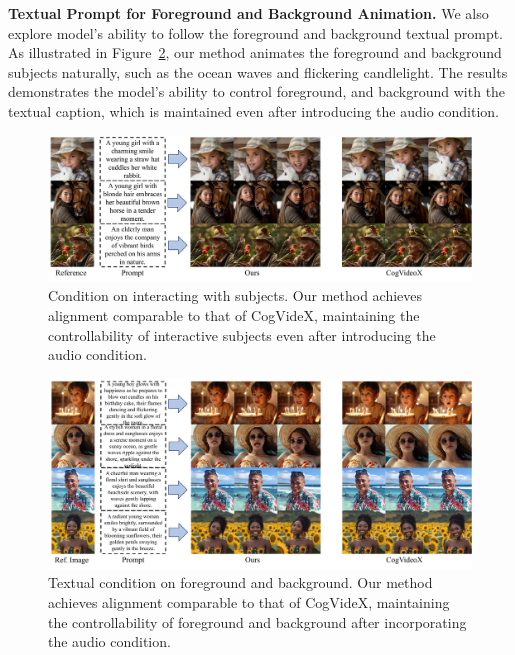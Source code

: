 \noindent\textbf{Textual Prompt for Foreground and Background Animation.} We also explore model's ability to follow the foreground and background textual prompt. As illustrated in Figure~\ref{fig:fgbg}, our method animates the foreground and background subjects naturally, such as the ocean waves and flickering candlelight. The results demonstrates the model's ability to control foreground, and background with the textual caption, which is maintained even after introducing the audio condition.

\begin{figure}[!h]
    \centering
    \includegraphics[width=.97\linewidth]{figs/text_cond_interact.pdf}
    \vspace{-4mm}
    \caption{{Condition on interacting with subjects. Our method achieves alignment comparable to that of CogVideX, maintaining the controllability of interactive subjects even after introducing the audio condition.}}
    \vspace{-2mm}
    \label{fig:inter}
\end{figure}

\begin{figure}[!h]
    \centering
    \includegraphics[width=.97\linewidth]{figs/text_cond_bgfg.pdf}
    \vspace{-4mm}
    \caption{{Textual condition on foreground and background. Our method achieves alignment comparable to that of CogVideX, maintaining the controllability of foreground and background after incorporating the audio condition. }}
    \label{fig:fgbg}
    \vspace{-3mm}
\end{figure}
